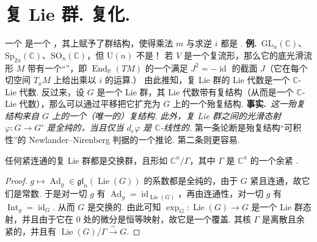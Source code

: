 \section{复 Lie 群. 复化.}\label{sec:lie-1-11}

\begin{numpara}[复 Lie 群]\label{np:lie-1-11-1}
一个  是一个 ，其上赋予了群结构，使得乘法 $m$ 与求逆 $i$ 都是 .
\noindent\textbf{例.}\ $\mathrm{GL}_n(\mathbb C)$、$\mathrm{Sp}_{2n}(\mathbb C)$、$\mathrm{SO}_n(\mathbb C)$，但 $\mathrm{U}(n)$ 不是！
若 $V$ 是一个复流形，那么它的底光滑流形 $M$ 带有一个``''，即 $\operatorname{End}_{\mathbb R}(TM)$ 的一个满足 $J^{2}=-\operatorname{id}$ 的截面 $J$（它在每个切空间 $T_xM$ 上给出乘以 $i$ 的运算.） 由此推知，复 Lie 群的 Lie 代数是一个 $\mathbb C$-Lie 代数.
反过来，设 $G$ 是一个 Lie 群，其 Lie 代数带有复结构（从而是一个 $\mathbb C$-Lie 代数），那么可以通过平移把它扩充为 $G$ 上的一个殆复结构.
\noindent\textbf{事实.}\ \emph{这一殆复结构来自 $G$ 上的一个（唯一的）复结构. 此外，复 Lie 群之间的光滑态射 $\varphi:G\longrightarrow G'$ 是全纯的，当且仅当 $d_e\varphi$ 是 $\mathbb C$-线性的.}
第一条论断是殆复结构``可积性''的 Newlander--Nirenberg 判据的一个推论. 第二条则更容易.
\begin{proposition*}
任何紧连通的复 Lie 群都是交换群，且形如 $\mathbb C^{n}/\Gamma$，其中 $\Gamma$ 是 $\mathbb C^{n}$ 的一个余紧 .
\end{proposition*}
\begin{proof}
$g\mapsto\operatorname{Ad}_g\in\mathfrak{gl}_n(\operatorname{Lie}(G))$ 的系数都是全纯的，由于 $G$ 紧且连通，故它们是常数. 于是对一切 $g$ 有 $\operatorname{Ad}_g=\operatorname{id}_{\operatorname{Lie}(G)}$，再由连通性，对一切 $g$ 有 $\operatorname{Int}_g=\operatorname{id}_G$. 从而 $G$ 是交换的. 由此可知 $\exp_G:\operatorname{Lie}(G)\longrightarrow G$ 是一个 Lie 群态射，并且由于它在 $0$ 处的微分是恒等映射，故它是一个覆盖. 其核 $\Gamma$ 是离散且余紧的，并且有 $\operatorname{Lie}(G)/\Gamma\xrightarrow{\ \sim\ }G$.
\end{proof}
\end{numpara}


